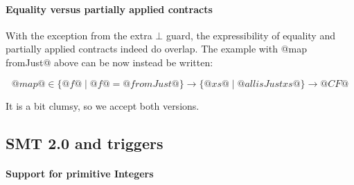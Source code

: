 \paragraph{Equality versus partially applied contracts}

With the exception from the extra $\bot$ guard, the expressibility of
equality and partially applied contracts indeed do overlap. The example
with @map fromJust@ above can be now instead be written:

$$@map@ \in \{ @f@ \mid @f@ = @fromJust@ \} \to \{ @xs@ \mid @all isJust xs@ \} \to @CF@$$

It is a bit clumsy, so we accept both versions.

\subsection{SMT 2.0 and triggers}
\paragraph{Support for primitive Integers}
